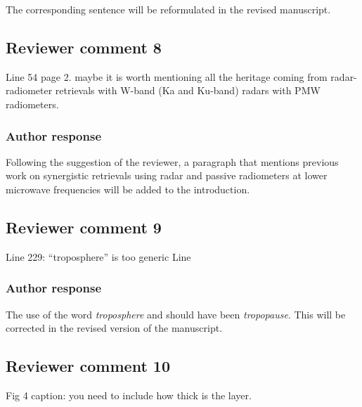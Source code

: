 \documentclass[11pt]{scrartcl}
\begin{document}
The corresponding sentence will be reformulated in the revised manuscript.


\subsection*{Reviewer comment 8}

Line 54 page 2.  maybe it is worth mentioning all the heritage coming from radar-radiometer retrievals with W-band (Ka and Ku-band) radars with PMW radiometers. 

\subsubsection*{Author response}

Following the suggestion of the reviewer, a paragraph that mentions previous work
on synergistic retrievals using radar and passive radiometers at lower microwave
frequencies will be added to the introduction.

%
%


\subsection*{Reviewer comment 9}
Line 229: “troposphere” is too generic Line

\subsubsection*{Author response}

The use of the word {\itshape troposphere} and should have been {\itshape tropopause}.
This will be corrected in the revised version of the manuscript.

\subsection*{Reviewer comment 10}
Fig 4 caption: you need to include how thick is the layer.
\end{document}
